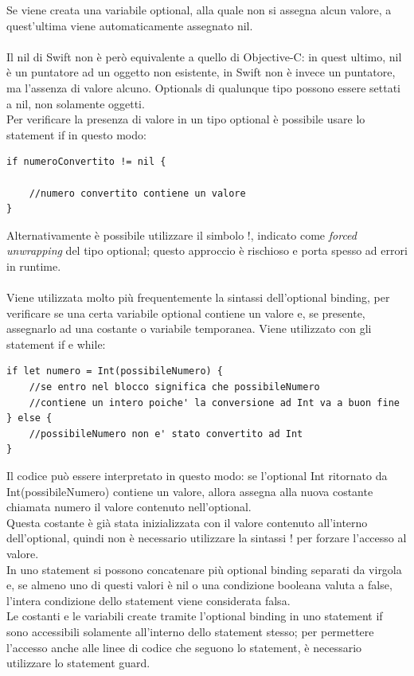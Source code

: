 Se viene creata una variabile optional, alla quale non si assegna alcun valore, a quest'ultima viene automaticamente assegnato nil.\\\\Il nil di Swift non è però equivalente a quello di Objective-C: in quest ultimo, nil è un puntatore ad un oggetto non esistente, in Swift non è invece un puntatore, ma l'assenza di valore alcuno. Optionals di qualunque tipo possono essere settati a nil, non solamente oggetti.\\
Per verificare la presenza di valore in un tipo optional è possibile usare lo statement if in questo modo: 
\lstset{language=[Objective]C, breakindent=40pt, breaklines}
\begin{lstlisting}
if numeroConvertito != nil {

	//numero convertito contiene un valore
}
\end{lstlisting}
Alternativamente è possibile utilizzare il simbolo !, indicato come \textit{forced unwrapping} del tipo optional; questo approccio è rischioso e porta spesso ad errori in runtime.
\\\\Viene utilizzata molto più frequentemente la sintassi dell'optional binding, per verificare se una certa variabile optional contiene un valore e, se presente, assegnarlo ad una costante o variabile temporanea. Viene utilizzato con gli statement if e while:
\begin{lstlisting}
if let numero = Int(possibileNumero) {
	//se entro nel blocco significa che possibileNumero 
	//contiene un intero poiche' la conversione ad Int va a buon fine
} else {
	//possibileNumero non e' stato convertito ad Int
}
\end{lstlisting}
Il codice può essere interpretato in questo modo: se l'optional Int ritornato da Int(possibileNumero) contiene un valore, allora assegna alla nuova costante chiamata numero il valore contenuto nell'optional. \\Questa costante è già stata inizializzata con il valore contenuto all'interno dell'optional, quindi non è necessario utilizzare la sintassi ! per forzare l'accesso al valore.\\In uno statement si possono concatenare più optional binding separati da virgola e, se almeno uno di questi valori è nil o una condizione booleana valuta a false, l'intera condizione dello statement viene considerata falsa.\\
Le costanti e le variabili create tramite l'optional binding in uno statement if sono accessibili solamente all'interno dello statement stesso; per permettere l'accesso anche alle linee di codice che seguono lo statement, è necessario utilizzare lo statement guard. 
